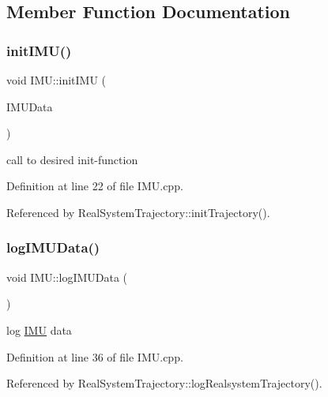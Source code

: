 \subsection{Member Function Documentation}
\mbox{\label{class_i_m_u_ae6159fdadab4855ca9a9bf6fccc6c078}} 
\subsubsection{\texorpdfstring{init\+I\+M\+U()}{initIMU()}}
{\footnotesize\ttfamily void I\+M\+U\+::init\+I\+MU (\begin{DoxyParamCaption}\item[{I\+M\+U\+Struct \&}]{I\+M\+U\+Data }\end{DoxyParamCaption})}



call to desired init-\/function 



Definition at line 22 of file I\+M\+U.\+cpp.



Referenced by Real\+System\+Trajectory\+::init\+Trajectory().

\mbox{\label{class_i_m_u_a3317b4c96f0f53c74d8c004eca0db59e}} 
\subsubsection{\texorpdfstring{log\+I\+M\+U\+Data()}{logIMUData()}}
{\footnotesize\ttfamily void I\+M\+U\+::log\+I\+M\+U\+Data (\begin{DoxyParamCaption}{ }\end{DoxyParamCaption})}



log \hyperlink{class_i_m_u}{I\+MU} data 



Definition at line 36 of file I\+M\+U.\+cpp.



Referenced by Real\+System\+Trajectory\+::log\+Realsystem\+Trajectory().

\mbox{\label{class_i_m_u_a6a3c828e32f2a299829aba91ede177e2}} 
